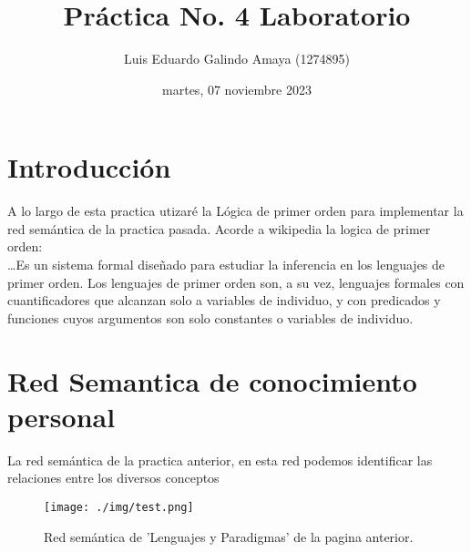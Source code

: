 \documentclass[11pt]{article}
\author{Luis Eduardo Galindo Amaya (1274895)}
\date{martes, 07 noviembre 2023}
\title{Práctica No. 4 Laboratorio}
\begin{document}
\tableofcontents
\pagebreak

\section{Introducción}
\label{sec:orgf522a28}
A lo largo de esta practica utizaré la Lógica de primer orden para
implementar la red semántica de la practica pasada. Acorde a wikipedia
la logica de primer orden: \\

\ldots{}Es un sistema formal diseñado para estudiar la inferencia en los
lenguajes de primer orden. Los lenguajes de primer orden son, a su
vez, lenguajes formales con cuantificadores que alcanzan solo a
variables de individuo, y con predicados y funciones cuyos argumentos
son solo constantes o variables de individuo\autocite{Wikipedia_2023}.

\section{Red Semantica de conocimiento personal}
\label{sec:orgc5e3a43}
La red semántica de la practica anterior, en esta red podemos
identificar las relaciones entre los diversos conceptos

\begin{figure}[htbp]
\centering
\texttt{[image: ./img/test.png]}
\caption{Red semántica de 'Lenguajes y Paradigmas' de la pagina anterior.}
\end{figure}
\end{document}
